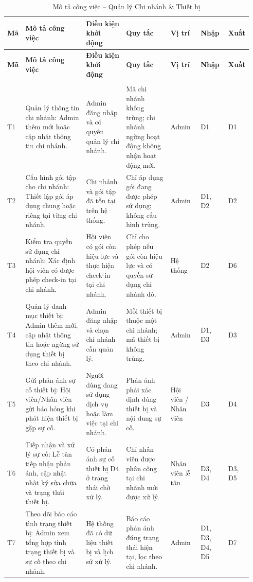\documentclass[a4paper,12pt]{article}
\begin{document}
{\setlength{\tabcolsep}{4pt}
\begin{longtable}{|L{0.9cm}|L{4.0cm}|L{2.5cm}|L{2.9cm}|L{1.7cm}|L{1.4cm}|L{1.4cm}|}
\hline \textbf{Mã} & \textbf{Mô tả công việc} & \textbf{Điều kiện khởi động} & \textbf{Quy tắc} & \textbf{Vị trí} & \textbf{Nhập} & \textbf{Xuất} \\ \hline \endfirsthead
\hline \textbf{Mã} & \textbf{Mô tả công việc} & \textbf{Điều kiện khởi động} & \textbf{Quy tắc} & \textbf{Vị trí} & \textbf{Nhập} & \textbf{Xuất} \\ \hline \endhead \hline \endfoot
\hline
\caption{Mô tả công việc -- Quản lý Chi nhánh \& Thiết bị} \\
\endlastfoot
T1 & Quản lý thông tin chi nhánh: Admin thêm mới hoặc cập nhật thông tin chi nhánh. & Admin đăng nhập và có quyền quản lý chi nhánh. & Mã chi nhánh không trùng; chi nhánh ngừng hoạt động không nhận hoạt động mới. & Admin & D1 & D1 \\ \hline
T2 & Cấu hình gói tập cho chi nhánh: Thiết lập gói áp dụng chung hoặc riêng tại từng chi nhánh. & Chi nhánh và gói tập đã tồn tại trên hệ thống. & Chỉ áp dụng gói đang được phép sử dụng; không cấu hình trùng. & Admin & D1, D2 & D2 \\ \hline
T3 & Kiểm tra quyền sử dụng chi nhánh: Xác định hội viên có được phép check-in tại chi nhánh. & Hội viên có gói còn hiệu lực và thực hiện check-in tại chi nhánh. & Chỉ cho phép nếu gói còn hiệu lực và có quyền sử dụng chi nhánh đó. & Hệ thống & D2 & D6 \\ \hline
T4 & Quản lý danh mục thiết bị: Admin thêm mới, cập nhật thông tin hoặc ngừng sử dụng thiết bị theo chi nhánh. & Admin đăng nhập và chọn chi nhánh cần quản lý. & Mỗi thiết bị thuộc một chi nhánh; mã thiết bị không trùng. & Admin & D1, D3 & D3 \\ \hline
T5 & Gửi phản ánh sự cố thiết bị: Hội viên/Nhân viên gửi báo hỏng khi phát hiện thiết bị gặp sự cố. & Người dùng đang sử dụng dịch vụ hoặc làm việc tại chi nhánh. & Phản ánh phải xác định đúng thiết bị và nội dung sự cố. & Hội viên / Nhân viên & D3 & D4 \\ \hline
T6 & Tiếp nhận và xử lý sự cố: Lễ tân tiếp nhận phản ánh, cập nhật nhật ký sửa chữa và trạng thái thiết bị. & Có phản ánh sự cố thiết bị D4 ở trạng thái chờ xử lý. & Chỉ nhân viên được phân công tại chi nhánh mới được xử lý. & Nhân viên lễ tân & D3, D4 & D3, D5 \\ \hline
T7 & Theo dõi báo cáo tình trạng thiết bị: Admin xem tổng hợp tình trạng thiết bị và sự cố theo chi nhánh. & Hệ thống đã có dữ liệu thiết bị và lịch sử xử lý. & Báo cáo phản ánh đúng trạng thái hiện tại, lọc theo chi nhánh. & Admin & D1, D3, D4, D5 & D7 \\ \hline
\end{longtable}
}
\end{document}
